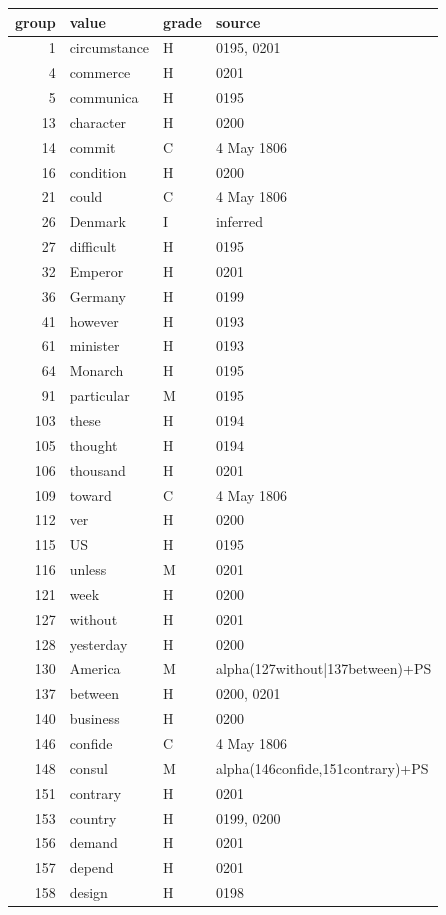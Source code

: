 \begin{longtable}{@{}rlll@{}}
\toprule group & value & grade & source \\ \midrule \endhead
1 & circumstance & H & 0195, 0201 \\
4 & commerce & H & 0201 \\
5 & communica & H & 0195 \\
13 & character & H & 0200 \\
14 & commit & C & 4 May 1806 \\
16 & condition & H & 0200 \\
21 & could & C & 4 May 1806 \\
26 & Denmark & I & inferred \\
27 & difficult & H & 0195 \\
32 & Emperor & H & 0201 \\
36 & Germany & H & 0199 \\
41 & however & H & 0193 \\
61 & minister & H & 0193 \\
64 & Monarch & H & 0195 \\
91 & particular & M & 0195 \\
103 & these & H & 0194 \\
105 & thought & H & 0194 \\
106 & thousand & H & 0201 \\
109 & toward & C & 4 May 1806 \\
112 & ver & H & 0200 \\
115 & US & H & 0195 \\
116 & unless & M & 0201 \\
121 & week & H & 0200 \\
127 & without & H & 0201 \\
128 & yesterday & H & 0200 \\
130 & America & M & alpha(127without|137between)+PS \\
137 & between & H & 0200, 0201 \\
140 & business & H & 0200 \\
146 & confide & C & 4 May 1806 \\
148 & consul & M & alpha(146confide,151contrary)+PS \\
151 & contrary & H & 0201 \\
153 & country & H & 0199, 0200 \\
156 & demand & H & 0201 \\
157 & depend & H & 0201 \\
158 & design & H & 0198 \\

\end{longtable}

